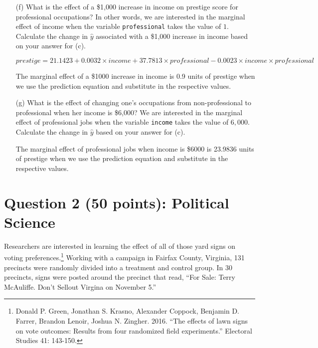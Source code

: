 \documentclass[12pt,letterpaper]{article}
\begin{document}
\begin{enumerate}
	\item [(f)]
	What is the effect of a \$1,000 increase in income on prestige score for professional occupations? In other words, we are interested in the marginal effect of income when the variable \texttt{professional} takes the value of $1$. Calculate the change in $\hat{y}$ associated with a \$1,000 increase in income based on your answer for (c).

$ prestige =  21.1423 + 0.0032 \times income + 37.7813 \times professional - 0.0023 \times income \times professional $

	 

	The marginal effect of a \$1000 increase in income is 0.9 units of prestige  when we use the prediction equation and substitute in the respective values. 
	
	\item [(g)]
	What is the effect of changing one's occupations from non-professional to professional when her income is \$6,000? We are interested in the marginal effect of professional jobs when the variable \texttt{income} takes the value of $6,000$. Calculate the change in $\hat{y}$ based on your answer for (c).
	
		 
	
	The marginal effect of professional jobs when income is \$6000 is 23.9836 units of prestige  when we use the prediction equation and substitute in the respective values. 
	
\end{enumerate}

\newpage

\section*{Question 2 (50 points): Political Science}
\vspace{.25cm}
\noindent 	Researchers are interested in learning the effect of all of those yard signs on voting preferences.\footnote{Donald P. Green, Jonathan	S. Krasno, Alexander Coppock, Benjamin D. Farrer,	Brandon Lenoir, Joshua N. Zingher. 2016. ``The effects of lawn signs on vote outcomes: Results from four randomized field experiments.'' Electoral Studies 41: 143-150. } Working with a campaign in Fairfax County, Virginia, 131 precincts were randomly divided into a treatment and control group. In 30 precincts, signs were posted around the precinct that read, ``For Sale: Terry McAuliffe. Don't Sellout Virgina on November 5.'' \\
\end{document}
